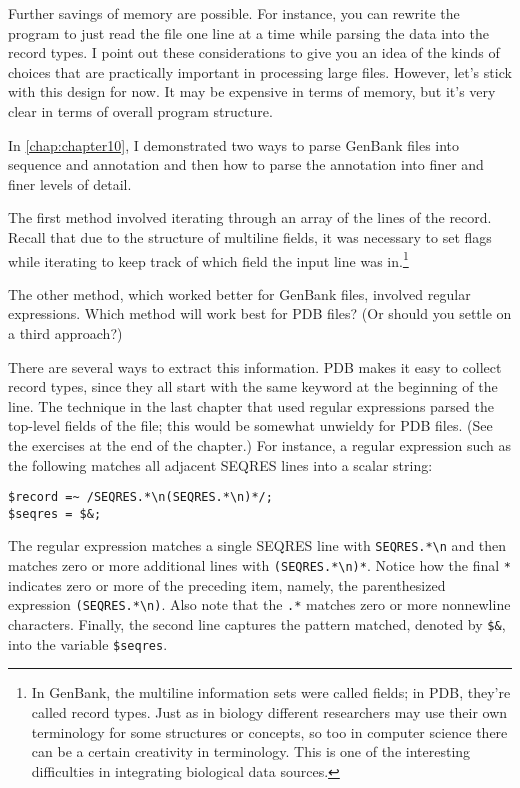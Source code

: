 Further savings of memory are possible. For instance, you can rewrite the program to just read the file one line at a time while parsing the data into the record types. I point out these considerations to give you an idea of the kinds of choices that are practically important in processing large files. However, let's stick with this design for now. It may be expensive in terms of memory, but it's very clear in terms of overall program structure.

In \autoref{chap:chapter10}, I demonstrated two ways to parse GenBank files into sequence and annotation and then how to parse the annotation into finer and finer levels of detail.

The first method involved iterating through an array of the lines of the record. Recall that due to the structure of multiline fields, it was necessary to set flags while iterating to keep track of which field the input line was in.\footnote{In GenBank, the multiline information sets were called fields; in PDB, they're called record types. Just as in biology different researchers may use their own terminology for some structures or concepts, so too in computer science there can be a certain creativity in terminology. This is one of the interesting difficulties in integrating biological data sources.}

The other method, which worked better for GenBank files, involved regular expressions. Which method will work best for PDB files? (Or should you settle on a third approach?)

There are several ways to extract this information. PDB makes it easy to collect record types, since they all start with the same keyword at the beginning of the line. The technique in the last chapter that used regular expressions parsed the top-level fields of the file; this would be somewhat unwieldy for PDB files. (See the exercises at the end of the chapter.) For instance, a regular expression such as the following matches all adjacent SEQRES lines into a scalar string: 

\begin{lstlisting}
$record =~ /SEQRES.*\n(SEQRES.*\n)*/;
$seqres = $&;
\end{lstlisting}

The regular expression matches a single SEQRES line with \verb|SEQRES.*\n| and then matches zero or more additional lines with \verb|(SEQRES.*\n)*|. Notice how the final \verb|*| indicates zero or more of the preceding item, namely, the parenthesized expression \verb|(SEQRES.*\n)|. Also note that the \verb|.*| matches zero or more nonnewline characters. Finally, the second line captures the pattern matched, denoted by \verb|$&|, into the variable \verb|$seqres|.

